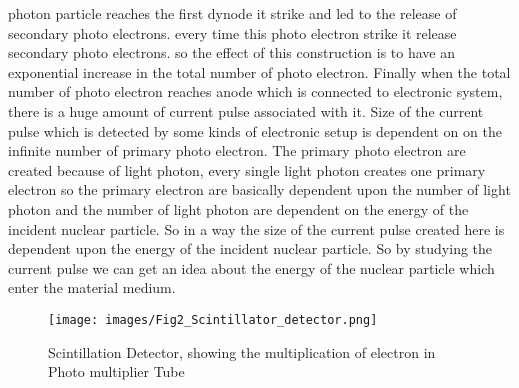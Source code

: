 \documentclass{article}
\begin{document}
\begin{multicols}{2}
photon particle reaches the first dynode it strike and led to the release of secondary photo electrons. every time this photo electron strike it release secondary photo electrons. so the effect of this construction is to have an exponential increase in the total number of photo electron. Finally when the total number of photo electron reaches anode which is connected to electronic system, there is a huge amount of current pulse associated with it. Size of the current pulse which is detected by some kinds of electronic setup is dependent on on the infinite number of primary photo electron. The primary photo electron  are created because of light photon, every single light photon creates one primary electron so the primary electron are basically dependent upon the number of light photon and the number of light photon are dependent on the energy of the incident nuclear particle. So in a way the size of the current pulse created here is dependent upon the energy of the incident nuclear particle. So by studying the current pulse we can get an idea about the energy of the nuclear particle which enter the material medium.
\end{multicols}
\begin{figure}[H]
    \centering
    \texttt{[image: images/Fig2\_Scintillator\_detector.png]}
    \caption{Scintillation Detector, showing the multiplication of electron in Photo multiplier Tube}
    \label{fig:2}
\end{figure}
\begin{multicols}{2}

\end{multicols}
\end{document}
